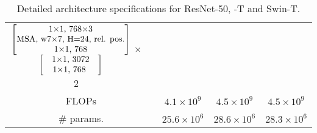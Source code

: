 \begin{table*}[!htbp]
{\begin{tabular}{c|c|c|c|c}
\multirow{5}{*}{$\begin{matrix}\begin{bmatrix}\text{1$\times$1, 768$\times$3}\\\text{MSA, w7$\times$7, H=24, rel. pos.}\\\text{1$\times$1, 768}\end{bmatrix}\\\begin{bmatrix}\text{\quad1$\times$1, 3072\quad}\\\text{\quad1$\times$1, 768\ \quad}\end{bmatrix}\end{matrix}$  $\times$ 2} \\
& & & & \\
& & & & \\
& & & & \\
& & & & \\
\hline
\multicolumn{2}{c|}{FLOPs}
&
$4.1 \times 10^9$
&
$4.5 \times 10^9$
&
$4.5 \times 10^9$
\\
\hline
\multicolumn{2}{c|}{\# params.}
&
$25.6 \times 10^6$
&
$28.6 \times 10^6$
&
$28.3 \times 10^6$ \\
\hline

\end{tabular}
}
\normalsize
\caption{Detailed architecture specifications for ResNet-50, \cnn{}-T and Swin-T.}
\label{table:arch-spec}
\end{table*}





